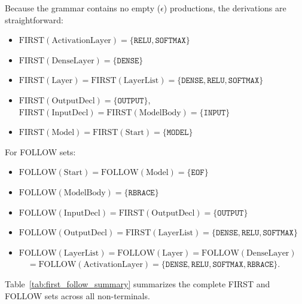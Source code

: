 \documentclass[11pt,a4paper]{article}
\begin{document}
Because the grammar contains no empty ($\epsilon$) productions, the derivations are straightforward:
\begin{itemize}[leftmargin=*]
    \item $\text{FIRST}(\text{ActivationLayer}) = \{\texttt{RELU}, \texttt{SOFTMAX}\}$
    \item $\text{FIRST}(\text{DenseLayer}) = \{\texttt{DENSE}\}$
    \item $\text{FIRST}(\text{Layer}) = \text{FIRST}(\text{LayerList}) = \{\texttt{DENSE}, \texttt{RELU}, \texttt{SOFTMAX}\}$
    \item $\text{FIRST}(\text{OutputDecl}) = \{\texttt{OUTPUT}\}$, $\text{FIRST}(\text{InputDecl}) = \text{FIRST}(\text{ModelBody}) = \{\texttt{INPUT}\}$
    \item $\text{FIRST}(\text{Model}) = \text{FIRST}(\text{Start}) = \{\texttt{MODEL}\}$
\end{itemize}

For FOLLOW sets:
\begin{itemize}[leftmargin=*]
    \item $\text{FOLLOW}(\text{Start}) = \text{FOLLOW}(\text{Model}) = \{\texttt{EOF}\}$
    \item $\text{FOLLOW}(\text{ModelBody}) = \{\texttt{RBRACE}\}$
    \item $\text{FOLLOW}(\text{InputDecl}) = \text{FIRST}(\text{OutputDecl}) = \{\texttt{OUTPUT}\}$
    \item $\text{FOLLOW}(\text{OutputDecl}) = \text{FIRST}(\text{LayerList}) = \{\texttt{DENSE}, \texttt{RELU}, \texttt{SOFTMAX}\}$
    \item $\text{FOLLOW}(\text{LayerList}) = \text{FOLLOW}(\text{Layer}) = \text{FOLLOW}(\text{DenseLayer})$ \\
    $\quad = \text{FOLLOW}(\text{ActivationLayer}) = \{\texttt{DENSE}, \texttt{RELU}, \texttt{SOFTMAX}, \texttt{RBRACE}\}$.
\end{itemize}

Table~\ref{tab:first_follow_summary} summarizes the complete FIRST and FOLLOW sets across all non-terminals.
\end{document}
